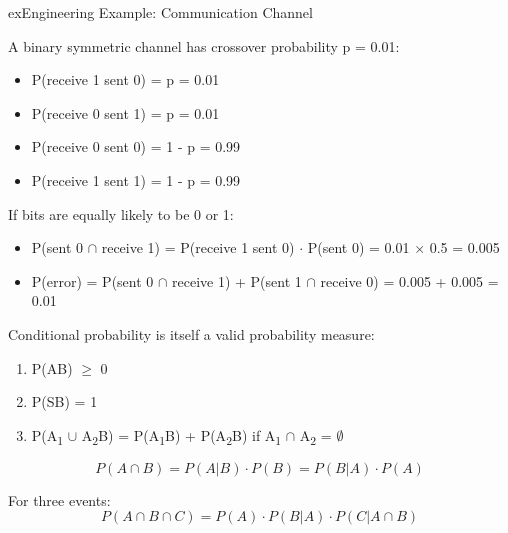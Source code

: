 \begin{PSbox}[unbreakable]{ex}{Engineering Example: Communication Channel}

A binary symmetric channel has crossover probability p = 0.01:

\begin{itemize}
\tightlist
\item
  P(receive 1 \textbar{} sent 0) = p = 0.01
\item
  P(receive 0 \textbar{} sent 1) = p = 0.01
\item
  P(receive 0 \textbar{} sent 0) = 1 - p = 0.99
\item
  P(receive 1 \textbar{} sent 1) = 1 - p = 0.99
\end{itemize}

If bits are equally likely to be 0 or 1:

\begin{itemize}
\tightlist
\item
  P(sent 0 \ensuremath{\cap} receive 1) = P(receive 1 \textbar{} sent 0) \ensuremath{\cdot} P(sent 0) = 0.01 \ensuremath{\times} 0.5 = 0.005
\item
  P(error) = P(sent 0 \ensuremath{\cap} receive 1) + P(sent 1 \ensuremath{\cap} receive 0) = 0.005 + 0.005 = 0.01
\end{itemize}

\end{PSbox}


Conditional probability is itself a valid probability measure:

\begin{enumerate}
\def\labelenumi{\arabic{enumi}.}
\tightlist
\item
  P(A\textbar{}B) \ensuremath{\ge} 0
\item
  P(S\textbar{}B) = 1
\item
  P(A\textsubscript{1} \ensuremath{\cup} A\textsubscript{2}\textbar{}B) = P(A\textsubscript{1}\textbar{}B) + P(A\textsubscript{2}\textbar{}B) if A\textsubscript{1} \ensuremath{\cap} A\textsubscript{2} = \ensuremath{\emptyset}
\end{enumerate}


\[P(A \cap B) = P(A|B) \cdot P(B) = P(B|A) \cdot P(A)\]

For three events:\PSbr{}\[P(A \cap B \cap C) = P(A) \cdot P(B|A) \cdot P(C|A \cap B)\]

